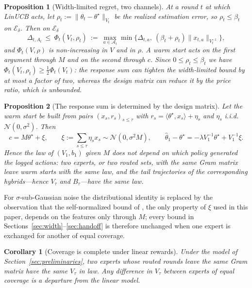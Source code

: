 \documentclass{article}
\newtheorem{proposition}{Proposition}
\newtheorem{corollary}{Corollary}
\theoremstyle{definition}
\theoremstyle{remark}
\theoremstyle{remark}
\begin{document}
\begin{proposition}[Width-limited regret, two channels]
\label{prop:two-channel}
At a round $t$ at which LinUCB acts, let
$\rho_t:=\|\widehat\theta_t-\theta^\star\|_{V_t}$ be the realized estimation
error, so $\rho_t\le\beta_t$ on $\mathcal E_\delta$. Then on $\mathcal E_\delta$
\begin{equation}
\label{eq:phi-two}
\Delta_{t,A_t}\ \le\ \Phi_t(V_t,\rho_t)\ :=\
\max_{a\in\mathcal A_t}\min\bigl\{\Delta_{t,a},\ (\beta_t+\rho_t)\|x_{t,a}\|_{V_t^{-1}}\bigr\},
\end{equation}
and $\Phi_t(V,\rho)$ is non-increasing in $V$ and in $\rho$. A warm start acts
on the first argument through $M$ and on the second through $c$. Since
$0\le\rho_t\le\beta_t$ we have $\Phi_t(V_t,\rho_t)\ge\tfrac12\Phi_t(V_t)$: the
response sum can tighten the width-limited bound by at most a factor of two,
whereas the design matrix can reduce it by the price ratio, which is unbounded.
\end{proposition}

\begin{proposition}[The response sum is determined by the design matrix]
\label{prop:response-sum}
Let the warm start be built from pairs $(x_s,r_s)_{s\le\tau}$ with
$r_s=\langle\theta^\star,x_s\rangle+\eta_s$ and $\eta_s$ i.i.d.\
$\mathcal N(0,\sigma^2)$. Then
\[
c=M\theta^\star+\xi,\qquad \xi:=\sum_{s\le\tau}\eta_sx_s\sim\mathcal N(0,\sigma^2M),
\qquad
\widehat\theta_1-\theta^\star=-\lambda V_1^{-1}\theta^\star+V_1^{-1}\xi .
\]
Hence the law of $(V_1,b_1)$ given $M$ does not depend on which policy
generated the logged actions: two experts, or two routed sets, with the same
Gram matrix leave warm starts with the same law, and the tail trajectories of
the corresponding hybrids---hence $V_\tau$ and $B_\tau$---have the same law.
\end{proposition}

For $\sigma$-sub-Gaussian noise the distributional identity is replaced by the
observation that the self-normalized bound of \cite{abbasi2011improved}, the
only property of $\xi$ used in this paper, depends on the features only
through $M$; every bound in Sections~\ref{sec:width}--\ref{sec:handoff} is
therefore unchanged when one expert is exchanged for another of equal coverage.

\begin{corollary}[Coverage is complete under linear rewards]
\label{cor:coverage-complete}
Under the model of Section~\ref{sec:preliminaries}, two experts whose routed
rounds leave the same Gram matrix have the same $V_\tau$ in law. Any
difference in $V_\tau$ between experts of equal coverage is a departure from
the linear model.
\end{corollary}
\end{document}
